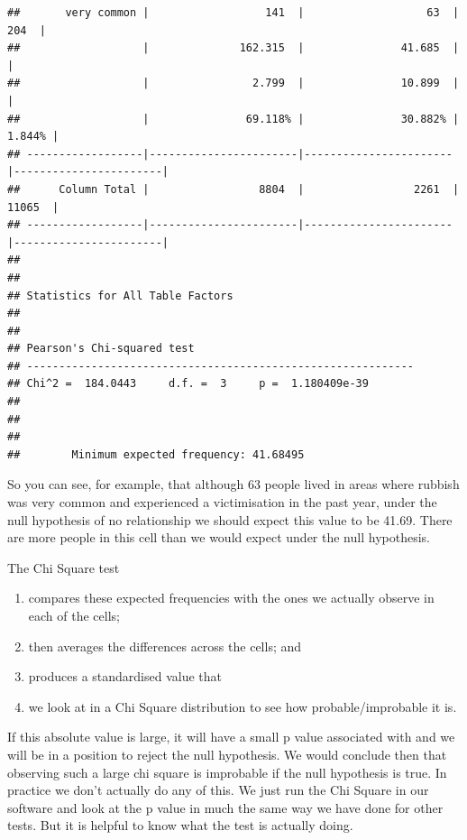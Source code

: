 \documentclass[
]{book}
\providecommand{\tightlist}{%
  \setlength{\itemsep}{0pt}\setlength{\parskip}{0pt}}
\begin{document}
\begin{verbatim}
##       very common |                  141  |                   63  |                  204  | 
##                   |              162.315  |               41.685  |                       | 
##                   |                2.799  |               10.899  |                       | 
##                   |               69.118% |               30.882% |                1.844% | 
## ------------------|-----------------------|-----------------------|-----------------------|
##      Column Total |                 8804  |                 2261  |                11065  | 
## ------------------|-----------------------|-----------------------|-----------------------|
## 
##  
## Statistics for All Table Factors
## 
## 
## Pearson's Chi-squared test 
## ------------------------------------------------------------
## Chi^2 =  184.0443     d.f. =  3     p =  1.180409e-39 
## 
## 
##  
##        Minimum expected frequency: 41.68495
\end{verbatim}

So you can see, for example, that although 63 people lived in areas where rubbish was very common and experienced a victimisation in the past year, under the null hypothesis of no relationship we should expect this value to be 41.69. There are more people in this cell than we would expect under the null hypothesis.

The Chi Square test

\begin{enumerate}
\def\labelenumi{(\arabic{enumi})}
\tightlist
\item
  compares these expected frequencies with the ones we actually observe in each of the cells;
\item
  then averages the differences across the cells; and
\item
  produces a standardised value that
\item
  we look at in a Chi Square distribution to see how probable/improbable it is.
\end{enumerate}

If this absolute value is large, it will have a small p value associated with and we will be in a position to reject the null hypothesis. We would conclude then that observing such a large chi square is improbable if the null hypothesis is true. In practice we don't actually do any of this. We just run the Chi Square in our software and look at the p value in much the same way we have done for other tests. But it is helpful to know what the test is actually doing.
\end{document}

